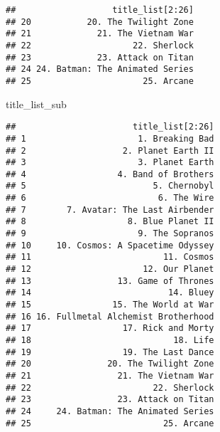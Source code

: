 \documentclass[
]{article}
\newenvironment{Shaded}{\begin{snugshade}}{\end{snugshade}}
\newcommand{\NormalTok}[1]{#1}
\begin{document}
\begin{verbatim}
##                   title_list[2:26]
## 20           20. The Twilight Zone
## 21             21. The Vietnam War
## 22                    22. Sherlock
## 23             23. Attack on Titan
## 24 24. Batman: The Animated Series
## 25                      25. Arcane
\end{verbatim}

\begin{Shaded}
\begin{Highlighting}[]
\NormalTok{title\_list\_sub}
\end{Highlighting}
\end{Shaded}

\begin{verbatim}
##                       title_list[2:26]
## 1                      1. Breaking Bad
## 2                   2. Planet Earth II
## 3                      3. Planet Earth
## 4                  4. Band of Brothers
## 5                         5. Chernobyl
## 6                          6. The Wire
## 7        7. Avatar: The Last Airbender
## 8                    8. Blue Planet II
## 9                      9. The Sopranos
## 10     10. Cosmos: A Spacetime Odyssey
## 11                          11. Cosmos
## 12                      12. Our Planet
## 13                 13. Game of Thrones
## 14                           14. Bluey
## 15                15. The World at War
## 16 16. Fullmetal Alchemist Brotherhood
## 17                  17. Rick and Morty
## 18                            18. Life
## 19                  19. The Last Dance
## 20               20. The Twilight Zone
## 21                 21. The Vietnam War
## 22                        22. Sherlock
## 23                 23. Attack on Titan
## 24     24. Batman: The Animated Series
## 25                          25. Arcane
\end{verbatim}
\end{document}
